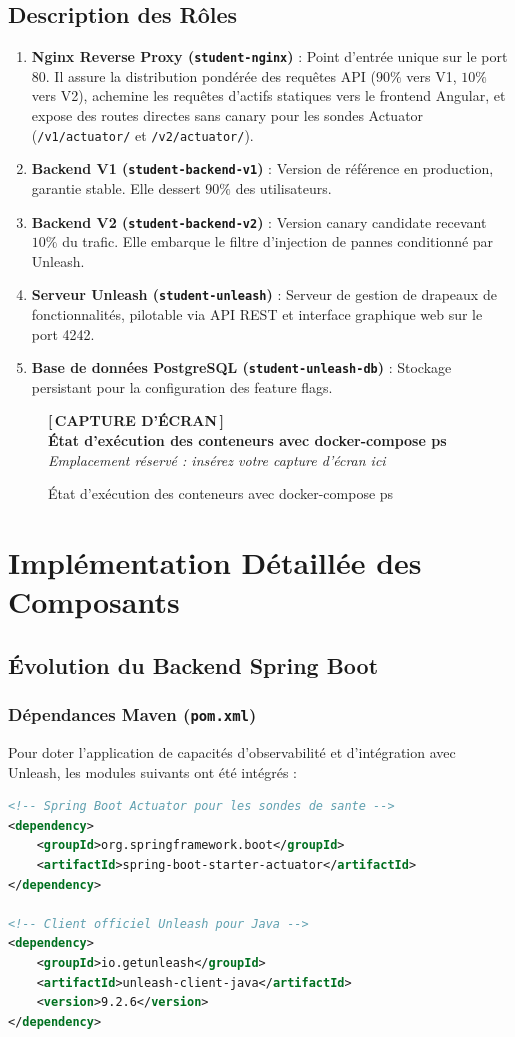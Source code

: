 \documentclass[12pt,a4paper]{article}
\newcommand{\screenshotplaceholder}[2][7cm]{%
  \begin{figure}[H]
    \centering
    \begin{tcolorbox}[
      width=0.95\textwidth,
      height=#1,
      valign=center,
      halign=center,
      colback=lightgray,
      colframe=secondaryblue!70,
      boxrule=1.5pt,
      dashed
    ]
      \centering
      \vspace{0.2cm}
      {\color{secondaryblue}\Huge\textbf{[\,CAPTURE D'ÉCRAN\,]}}\\[0.4cm]
      {\color{darkgray}\large\textbf{#2}}\\[0.2cm]
      {\small\textit{Emplacement réservé : insérez votre capture d'écran ici}}
      \vspace{0.2cm}
    \end{tcolorbox}
    \caption{#2}
    \label{fig:#2}
  \end{figure}
}
\begin{document}
\subsection{Description des Rôles}
\begin{enumerate}
    \item \textbf{Nginx Reverse Proxy (\texttt{student-nginx})} : Point d'entrée unique sur le port 80. Il assure la distribution pondérée des requêtes API ($90\%$ vers V1, $10\%$ vers V2), achemine les requêtes d'actifs statiques vers le frontend Angular, et expose des routes directes sans canary pour les sondes Actuator (\texttt{/v1/actuator/} et \texttt{/v2/actuator/}).
    \item \textbf{Backend V1 (\texttt{student-backend-v1})} : Version de référence en production, garantie stable. Elle dessert $90\%$ des utilisateurs.
    \item \textbf{Backend V2 (\texttt{student-backend-v2})} : Version canary candidate recevant $10\%$ du trafic. Elle embarque le filtre d'injection de pannes conditionné par Unleash.
    \item \textbf{Serveur Unleash (\texttt{student-unleash})} : Serveur de gestion de drapeaux de fonctionnalités, pilotable via API REST et interface graphique web sur le port 4242.
    \item \textbf{Base de données PostgreSQL (\texttt{student-unleash-db})} : Stockage persistant pour la configuration des feature flags.
\end{enumerate}

\screenshotplaceholder[6cm]{État d'exécution des conteneurs avec docker-compose ps}

\section{Implémentation Détaillée des Composants}

\subsection{Évolution du Backend Spring Boot}

\subsubsection{Dépendances Maven (\texttt{pom.xml})}
Pour doter l'application de capacités d'observabilité et d'intégration avec Unleash, les modules suivants ont été intégrés :
\begin{lstlisting}[language=XML]
<!-- Spring Boot Actuator pour les sondes de sante -->
<dependency>
    <groupId>org.springframework.boot</groupId>
    <artifactId>spring-boot-starter-actuator</artifactId>
</dependency>

<!-- Client officiel Unleash pour Java -->
<dependency>
    <groupId>io.getunleash</groupId>
    <artifactId>unleash-client-java</artifactId>
    <version>9.2.6</version>
</dependency>
\end{lstlisting}
\end{document}
